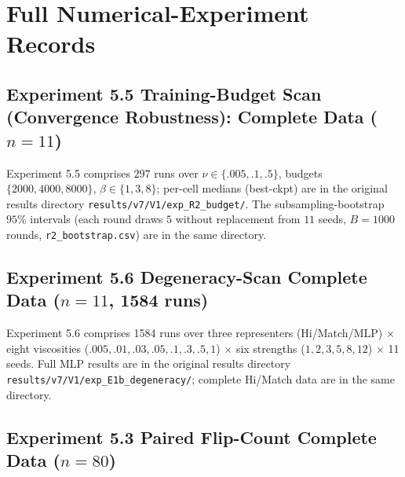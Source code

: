 \documentclass[11pt]{article}
\numberwithin{equation}{section}
\begin{document}
\FloatBarrier
\normalsize\setlength{\tabcolsep}{6pt}
\section{Full Numerical-Experiment Records}\label{app:tables}

\subsection{Experiment 5.5 Training-Budget Scan (Convergence Robustness): Complete Data ($n=11$)}

Experiment 5.5 comprises $297$ runs over $\nu\in\{.005,.1,.5\}$, budgets $\{2000,4000,8000\}$, $\beta\in\{1,3,8\}$; per-cell medians (best-ckpt) are in the original results directory \texttt{results/\hspace{0pt}v7/\hspace{0pt}V1/\hspace{0pt}exp\_\hspace{0pt}R2\_\hspace{0pt}budget/\hspace{0pt}}. The subsampling-bootstrap $95\%$ intervals (each round draws $5$ without replacement from $11$ seeds, $B=1000$ rounds, \texttt{r2\_\hspace{0pt}bootstrap.csv}) are in the same directory.

\subsection{Experiment 5.6 Degeneracy-Scan Complete Data ($n=11$, 1584 runs)}

Experiment 5.6 comprises 1584 runs over three representers (Hi/Match/MLP) $\times$ eight viscosities ($.005,.01,.03,.05,.1,.3,.5,1$) $\times$ six strengths ($1,2,3,5,8,12$) $\times$ 11 seeds. Full MLP results are in the original results directory \texttt{results/\hspace{0pt}v7/\hspace{0pt}V1/\hspace{0pt}exp\_\hspace{0pt}E1b\_\hspace{0pt}degeneracy/\hspace{0pt}}; complete Hi/Match data are in the same directory.

\subsection{Experiment 5.3 Paired Flip-Count Complete Data ($n=80$)}
\end{document}
